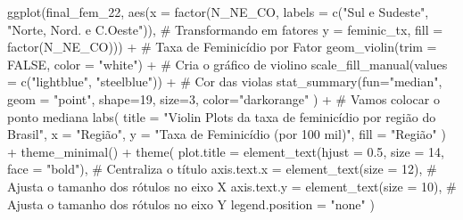 \documentclass[
  letterpaper,
  DIV=11,
  numbers=noendperiod]{scrreprt}
\newenvironment{Shaded}{\begin{snugshade}}{\end{snugshade}}
\newcommand{\AttributeTok}[1]{\textcolor[rgb]{0.40,0.45,0.13}{#1}}
\newcommand{\CommentTok}[1]{\textcolor[rgb]{0.37,0.37,0.37}{#1}}
\newcommand{\ConstantTok}[1]{\textcolor[rgb]{0.56,0.35,0.01}{#1}}
\newcommand{\DecValTok}[1]{\textcolor[rgb]{0.68,0.00,0.00}{#1}}
\newcommand{\FloatTok}[1]{\textcolor[rgb]{0.68,0.00,0.00}{#1}}
\newcommand{\FunctionTok}[1]{\textcolor[rgb]{0.28,0.35,0.67}{#1}}
\newcommand{\NormalTok}[1]{\textcolor[rgb]{0.00,0.23,0.31}{#1}}
\newcommand{\SpecialCharTok}[1]{\textcolor[rgb]{0.37,0.37,0.37}{#1}}
\newcommand{\StringTok}[1]{\textcolor[rgb]{0.13,0.47,0.30}{#1}}
\begin{document}
\begin{Shaded}
\begin{Highlighting}[]
\FunctionTok{ggplot}\NormalTok{(final\_fem\_22, }\FunctionTok{aes}\NormalTok{(}\AttributeTok{x =} \FunctionTok{factor}\NormalTok{(N\_NE\_CO, }\AttributeTok{labels =} \FunctionTok{c}\NormalTok{(}\StringTok{"Sul e Sudeste"}\NormalTok{, }\StringTok{"Norte, Nord. e C.Oeste"}\NormalTok{)),  }\CommentTok{\# Transformando em fatores}
                         \AttributeTok{y =}\NormalTok{ feminic\_tx, }\AttributeTok{fill =} \FunctionTok{factor}\NormalTok{(N\_NE\_CO))) }\SpecialCharTok{+}                                   \CommentTok{\# Taxa de Feminicídio por Fator}
  \FunctionTok{geom\_violin}\NormalTok{(}\AttributeTok{trim =} \ConstantTok{FALSE}\NormalTok{, }\AttributeTok{color =} \StringTok{"white"}\NormalTok{) }\SpecialCharTok{+}                                                        \CommentTok{\# Cria o gráfico de violino}
  \FunctionTok{scale\_fill\_manual}\NormalTok{(}\AttributeTok{values =} \FunctionTok{c}\NormalTok{(}\StringTok{"lightblue"}\NormalTok{, }\StringTok{"steelblue"}\NormalTok{)) }\SpecialCharTok{+}                                           \CommentTok{\# Cor das violas}
  \FunctionTok{stat\_summary}\NormalTok{(}\AttributeTok{fun=}\StringTok{"median"}\NormalTok{, }\AttributeTok{geom =} \StringTok{"point"}\NormalTok{, }\AttributeTok{shape=}\DecValTok{19}\NormalTok{, }\AttributeTok{size=}\DecValTok{3}\NormalTok{, }\AttributeTok{color=}\StringTok{"darkorange"}\NormalTok{  ) }\SpecialCharTok{+}                \CommentTok{\# Vamos colocar o ponto mediana}
  \FunctionTok{labs}\NormalTok{(}
    \AttributeTok{title =} \StringTok{"Violin Plots da taxa de feminicídio por região do Brasil"}\NormalTok{,}
    \AttributeTok{x =} \StringTok{"Região"}\NormalTok{,}
    \AttributeTok{y =} \StringTok{"Taxa de Feminicídio (por 100 mil)"}\NormalTok{,}
    \AttributeTok{fill =} \StringTok{"Região"}
\NormalTok{  ) }\SpecialCharTok{+}
  \FunctionTok{theme\_minimal}\NormalTok{() }\SpecialCharTok{+}
  \FunctionTok{theme}\NormalTok{(}
    \AttributeTok{plot.title =} \FunctionTok{element\_text}\NormalTok{(}\AttributeTok{hjust =} \FloatTok{0.5}\NormalTok{, }\AttributeTok{size =} \DecValTok{14}\NormalTok{, }\AttributeTok{face =} \StringTok{"bold"}\NormalTok{),              }\CommentTok{\# Centraliza o título}
    \AttributeTok{axis.text.x =} \FunctionTok{element\_text}\NormalTok{(}\AttributeTok{size =} \DecValTok{12}\NormalTok{),                                         }\CommentTok{\# Ajusta o tamanho dos rótulos no eixo X}
    \AttributeTok{axis.text.y =} \FunctionTok{element\_text}\NormalTok{(}\AttributeTok{size =} \DecValTok{10}\NormalTok{),                                         }\CommentTok{\# Ajusta o tamanho dos rótulos no eixo Y}
    \AttributeTok{legend.position =} \StringTok{"none"}\NormalTok{  )}
\end{Highlighting}
\end{Shaded}
\end{document}
